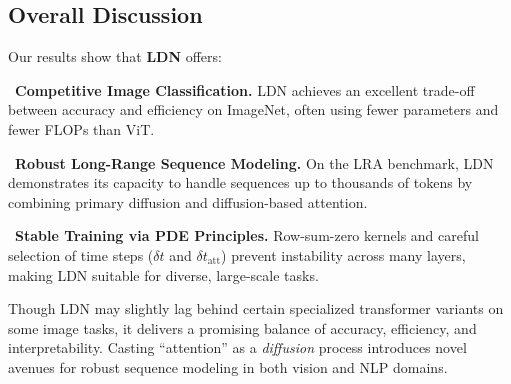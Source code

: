 \subsection{Overall Discussion}
Our results show that \textbf{LDN} offers:

~\textbf{Competitive Image Classification.}
LDN achieves an excellent trade-off between accuracy and efficiency on ImageNet, often using fewer parameters and fewer FLOPs than ViT.

~\textbf{Robust Long-Range Sequence Modeling.}
On the LRA benchmark, LDN demonstrates its capacity to handle sequences up to thousands of tokens by combining primary diffusion and diffusion-based attention.

~\textbf{Stable Training via PDE Principles.}
Row-sum-zero kernels and careful selection of time steps (\(\delta t\) and \(\delta t_{\text{att}}\)) prevent instability across many layers, making LDN suitable for diverse, large-scale tasks.

Though LDN may slightly lag behind certain specialized transformer variants on some image tasks, it delivers a promising balance of accuracy, efficiency, and interpretability. Casting “attention” as a \emph{diffusion} process introduces novel avenues for robust sequence modeling in both vision and NLP domains.
